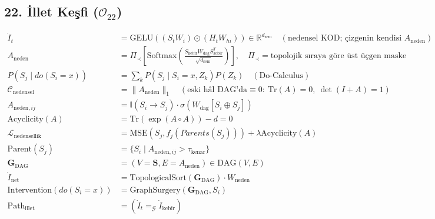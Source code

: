 \documentclass[11pt, a4paper]{article}
\begin{document}
\subsection{22. İllet Keşfi ($\mathcal{O}_{22}$)}
\begin{align}
\dot{I}_t &= \text{GELU}\left( (S_t W_i) \odot (H_t W_{hi}) \right) \in \mathbb{R}^{d_{\text{sem}}} \quad (\text{nedensel KOD; çizgenin kendisi } A_{\text{neden}}) \\
A_{\text{neden}} &= \Pi_{\prec} \left[ \text{Softmax}\left( \frac{S_{\text{kebîr}} W_{\text{dag}} S_{\text{kebîr}}^T}{\sqrt{d_{\text{sem}}}} \right) \right], \quad \Pi_{\prec} = \text{topolojik sıraya göre üst üçgen maske} \\
P(S_j \mid do(S_i = x)) &= \sum_k P(S_j \mid S_i=x, Z_k) P(Z_k) \quad (\text{Do-Calculus}) \\
\mathcal{C}_{\text{nedensel}} &= \|A_{\text{neden}}\|_1 \quad (\text{eski hâl DAG'da} \equiv 0: \ \text{Tr}(A) = 0, \ \det(I+A) = 1) \\
A_{\text{neden}, ij} &= \mathbb{I}(S_i \to S_j) \cdot \sigma(W_{\text{dag}} [S_i \oplus S_j]) \\
\text{Acyclicity}(A) &= \text{Tr}(\exp(A \circ A)) - d = 0 \\
\mathcal{L}_{\text{nedensellik}} &= \text{MSE}(S_j, f_j(Parents(S_j))) + \lambda \text{Acyclicity}(A) \\
\text{Parent}(S_j) &= \{ S_i \mid A_{\text{neden}, ij} > \tau_{\text{kenar}} \} \\
\mathbf{G}_{\text{DAG}} &= (V=\mathbf{S}, E=A_{\text{neden}}) \in \text{DAG}(V, E) \\
\dot{I}_{\text{net}} &= \text{TopologicalSort}(\mathbf{G}_{\text{DAG}}) \cdot W_{\text{neden}} \\
\text{Intervention}(do(S_i=x)) &= \text{GraphSurgery}(\mathbf{G}_{\text{DAG}}, S_i) \\
\text{Path}_{\text{illet}} &= (\dot{I}_t =_{\mathcal{G}} \dot{I}_{\text{kebîr}})
\end{align}
\end{document}
